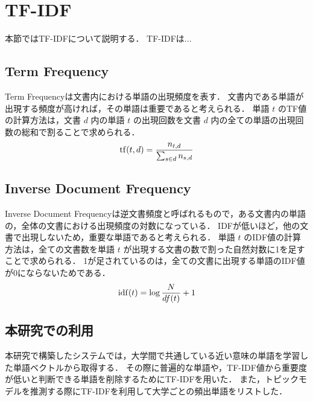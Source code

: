 \section{TF-IDF}
本節ではTF-IDFについて説明する．
TF-IDFは...

\subsection{Term Frequency}
Term Frequencyは文書内における単語の出現頻度を表す．
文書内である単語が出現する頻度が高ければ，その単語は重要であると考えられる．
単語 $ t $ のTF値の計算方法は，文書 $ d $ 内の単語 $ t $ の出現回数を文書 $ d $ 内の全ての単語の出現回数の総和で割ることで求められる．
\begin{displaymath}
{\rm tf}(t, d) = \frac{n_{t, d}}{\sum_{s \in d} n_{s, d}}
\end{displaymath}

\subsection{Inverse Document Frequency}
Inverse Document Frequencyは逆文書頻度と呼ばれるもので，ある文書内の単語の，全体の文書における出現頻度の対数になっている．
IDFが低いほど，他の文書で出現しないため，重要な単語であると考えられる．
単語 $ t $ のIDF値の計算方法は，全ての文書数を単語 $ t $ が出現する文書の数で割った自然対数に1を足すことで求められる．
1が足されているのは，全ての文書に出現する単語のIDF値が0にならないためである．
\begin{displaymath}
{\rm idf}(t) = \log \frac{N}{df(t)} + 1
\end{displaymath}

\subsection{本研究での利用}
本研究で構築したシステムでは，大学間で共通している近い意味の単語を学習した単語ベクトルから取得する．
その際に普遍的な単語や，TF-IDF値から重要度が低いと判断できる単語を削除するためにTF-IDFを用いた．
また，トピックモデルを推測する際にTF-IDFを利用して大学ごとの頻出単語をリストした．